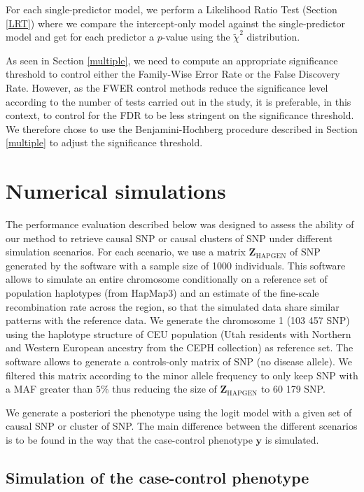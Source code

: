 \documentclass[]{book}
\begin{document}
For each single-predictor model, we perform a Likelihood Ratio Test
(Section \ref{LRT}) where we compare the intercept-only model against
the single-predictor model and get for each predictor a \(p\)-value using
the \(\tilde\chi^2\) distribution.

As seen in Section \ref{multiple}, we need to compute an appropriate
significance threshold to control either the Family-Wise Error Rate or
the False Discovery Rate. However, as the FWER control methods reduce
the significance level according to the number of tests carried out in
the study, it is preferable, in this context, to control for the FDR to
be less stringent on the significance threshold. We therefore chose to
use the Benjamini-Hochberg procedure described in Section \ref{multiple} to
adjust the significance threshold.

\hypertarget{numsim}{%
\section{Numerical simulations}\label{numsim}}

The performance evaluation described below was designed to assess the
ability of our method to retrieve causal SNP or causal clusters of SNP
under different simulation scenarios. For each scenario, we use a matrix
\(\mathbf{Z}_{\text{HAPGEN}}\) of SNP generated by the software
\citep{su_hapgen2_2011} with a sample size of 1000 individuals. This software
allows to simulate an entire chromosome conditionally on a reference set
of population haplotypes (from HapMap3) and an estimate of the
fine-scale recombination rate across the region, so that the simulated
data share similar patterns with the reference data. We generate the
chromosome 1 (103 457 SNP) using the haplotype structure of CEU
population (Utah residents with Northern and Western European ancestry
from the CEPH collection) as reference set. The software allows to
generate a controls-only matrix of SNP (no disease allele). We filtered
this matrix according to the minor allele frequency to only keep SNP
with a MAF greater than \(5\%\) thus reducing the size of
\(\mathbf{Z}_{\text{HAPGEN}}\) to 60 179 SNP.

We generate a posteriori the phenotype using the logit model with a
given set of causal SNP or cluster of SNP. The main difference between
the different scenarios is to be found in the way that the case-control
phenotype \(\mathbf{y}\) is simulated.

\hypertarget{simupheno}{%
\subsection{Simulation of the case-control phenotype}\label{simupheno}}
\end{document}
